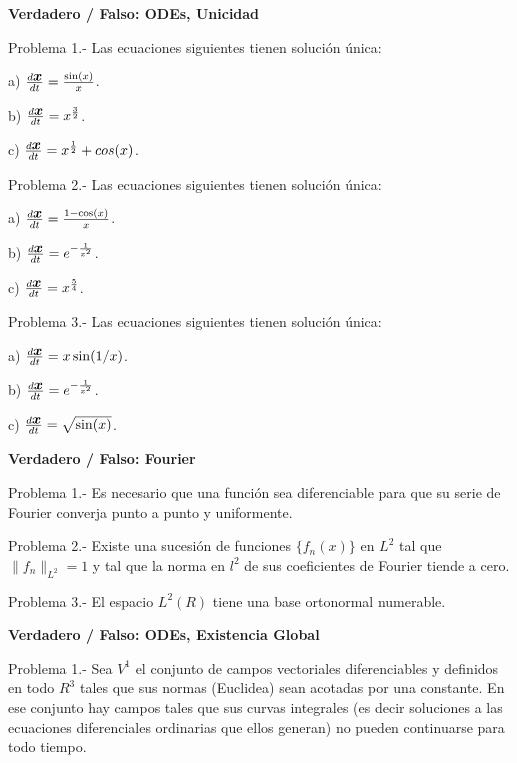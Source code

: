\documentclass{article}
\newcommand{\ve}[1]{\mbox{\boldmath ${#1}$}}
\begin{document}
\newpage

\begin{center}
  \textbf{Verdadero / Falso: ODEs, Unicidad}
\end{center}
\vspace{1cm}

Problema 1.- Las ecuaciones siguientes tienen soluci\'on \'unica:

a) $\frac{d\ve{x}}{dt} = \frac{\sin(x)}{x}$.

b) $\frac{d\ve{x}}{dt} = x^{\frac{3}{2}}$.

c) $\frac{d\ve{x}}{dt} = x^{\frac{1}{2}} + cos(x)$.

Problema 2.- Las ecuaciones siguientes tienen soluci\'on \'unica:

a) $\frac{d\ve{x}}{dt} = \frac{1 - \cos(x)}{x}$.

b) $\frac{d\ve{x}}{dt} = e^{-\frac{1}{x^2}}$.

c) $\frac{d\ve{x}}{dt} = x^{\frac{5}{4}}$.


Problema 3.- Las ecuaciones siguientes tienen soluci\'on \'unica:

a) $\frac{d\ve{x}}{dt} = x\sin(1/x)$.

b) $\frac{d\ve{x}}{dt} = e^{-\frac{1}{x^2}}$.

c) $\frac{d\ve{x}}{dt} = \sqrt{\sin(x)}$.



\begin{center}
  \textbf{Verdadero / Falso: Fourier}
\end{center}

Problema 1.- Es necesario que una funci\'on sea diferenciable para que su
serie de Fourier converja punto a punto y uniformente.

Problema 2.- Existe una sucesi\'on de funciones $\{f_n(x)\}$ en $L^2$ tal 
que 
$\|f_n\|_{L^2} = 1$ 
y tal que la norma en $l^2$ de sus coeficientes de
Fourier tiende a cero.

Problema 3.- El espacio $L^2(R)$ tiene una base ortonormal numerable.


\begin{center}
  \textbf{Verdadero / Falso: ODEs, Existencia Global}
\end{center}

Problema 1.- Sea $V^1$ el conjunto de campos vectoriales diferenciables y 
definidos en todo  $R^3$ tales que sus normas (Euclidea) sean acotadas por 
una constante. En ese conjunto hay campos tales que sus curvas integrales
(es decir soluciones a las ecuaciones diferenciales ordinarias que ellos
generan) no pueden continuarse para todo tiempo.
\end{document}

